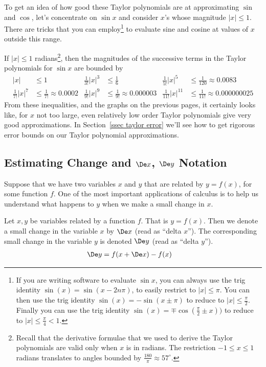 To get an idea of how good these Taylor polynomials are at approximating $\sin$ and
$\cos$, let's concentrate on $\sin x$ and consider $x$'s whose magnitude $|x|\le 1$.
There are tricks that you can employ\footnote{If you are writing software to evaluate
$\sin x$, you can always use the trig identity $\sin(x)=\sin(x-2n\pi)$, to  easily
restrict to $|x|\le\pi$. You can then use the trig identity $\sin(x)=-\sin(x\pm\pi)$ to
reduce to $|x|\le\tfrac{\pi}{2}$. Finally you can use the trig identity
$\sin(x)=\mp\cos(\tfrac{\pi}{2}\pm x))$ to reduce to $|x|\le\tfrac{\pi}{4} < 1$.} to
evaluate sine and cosine at values of $x$ outside this range.

If $|x|\le 1$ radians\footnote{Recall that the derivative formulae that we used to
derive the Taylor polynomials are valid only when $x$ is in radians. The
restriction $-1 \leq x \leq 1$ radians translates to angles bounded by
$\tfrac{180}{\pi}\approx 57^\circ$.}, then the magnitudes of the successive
terms in the Taylor polynomials for $\sin x$ are bounded by
\begin{align*}
|x|&\le 1 &
\tfrac{1}{3!}|x|^3&\le\tfrac{1}{6} &
\tfrac{1}{5!}|x|^5&\le\tfrac{1}{120}\approx 0.0083 \\
\tfrac{1}{7!}|x|^7&\le\tfrac{1}{7!}\approx 0.0002 &
\tfrac{1}{9!}|x|^9&\le\tfrac{1}{9!}\approx 0.000003 &
\tfrac{1}{11!}|x|^{11}&\le\tfrac{1}{11!}\approx 0.000000025
\end{align*}
From these inequalities, and the graphs on the previous pages, it certainly looks like,
for $x$ not too large, even relatively low order Taylor polynomials give very good
approximations. In Section~\ref{ssec taylor error} we'll see how to get rigorous error
bounds on our Taylor polynomial approximations.




\subsection{Estimating Change and $\De x$, $\De y$ Notation}
\label{ssec_est_change}


Suppose that we have two variables $x$ and $y$ that are related by $y=f(x)$, for some
function $f$. One of the most important applications of calculus is to help us understand
what happens to $y$ when we make a small change in $x$.

\begin{notn}\label{ntn_3_4_2}
 Let $x,y$ be variables related by a function $f$. That is $y = f(x)$. Then we denote a
  small change in the variable $x$ by $\De x$ (read as ``delta $x$''). The corresponding
small change in the variable $y$ is denoted $\De y$ (read as ``delta $y$'').
\begin{align*}
  \De y &= f(x+\De x) - f(x)
\end{align*}
\end{notn}

